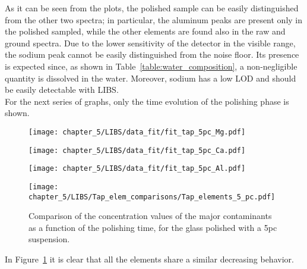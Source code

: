  As it can be seen from the plots, the polished sample can be easily distinguished from the other two spectra; in particular, the aluminum peaks are present only in the polished sampled, while the other elements are found also in the raw and ground spectra. Due to the lower sensitivity of the detector in the visible range, the sodium peak cannot be easily distinguished from the noise floor. Its presence is expected since, as shown in Table~\ref{table:water_composition}, a non-negligible quantity is dissolved in the water. Moreover, sodium has a low LOD and should be easily detectable with LIBS.
\\
For the next series of graphs, only the time evolution of the polishing phase is shown.
\begin{figure}[H]
    \centering
    \texttt{[image: chapter\_5/LIBS/data\_fit/fit\_tap\_5pc\_Mg.pdf]} 
 \end{figure}
\vspace*{-48pt}
 \begin{figure}[H]
    \centering
    \texttt{[image: chapter\_5/LIBS/data\_fit/fit\_tap\_5pc\_Ca.pdf]} 
 \end{figure}
 \begin{figure}[H]
    \centering
    \texttt{[image: chapter\_5/LIBS/data\_fit/fit\_tap\_5pc\_Al.pdf]} 
 \end{figure}

    \vspace*{-20pt}
 \begin{figure}[H]
    \centering
    \texttt{[image: chapter\_5/LIBS/Tap\_elem\_comparisons/Tap\_elements\_5\_pc.pdf]} 
    \vspace*{-30pt}
    \caption{Comparison of the concentration values of the major contaminants as a function of the polishing time, for the glass polished with a 5pc suspension.}
    \label{fig:tap_elem_5pc}
 \end{figure}
 In Figure~\ref{fig:tap_elem_5pc} it is clear that all the elements share a similar decreasing behavior.





